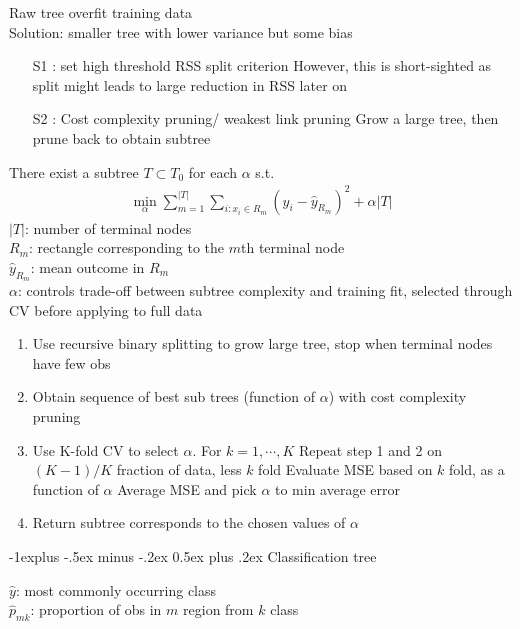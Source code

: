 \documentclass[a4paper,12pt,landscape]{article}
\makeatletter
\renewcommand{\subsection}{\@startsection{subsection}{2}{0mm}%
                                {-1explus -.5ex minus -.2ex}%
                                {0.5ex plus .2ex}%
                                {\normalfont\normalsize\bfseries\color{blue}}}
\makeatother
\begin{document}
\begin{multicols}{3}
Raw tree overfit training data\\
Solution: smaller tree with lower variance but some bias

\begin{enumerate}
    \item[S1]: set high threshold RSS split criterion
        \subitem However, this is short-sighted as split might leads to large reduction in RSS later on
    \item[S2]: Cost complexity pruning/ weakest link pruning
        \subitem Grow a large tree, then prune back to obtain subtree
\end{enumerate}

There exist a subtree $T \subset T_0$ for each $\alpha$ s.t.
\begin{align*}
    \min_{\alpha} \sum_{m=1}^{|T|}\sum_{i:x_i\in R_m} (y_i - \hat y_{R_m})^2 + \alpha |T|
\end{align*}
$|T|$: number of terminal nodes\\
$R_m$: rectangle corresponding to the $m$th terminal node\\
$\hat{y}_{R_m}$: mean outcome in $R_m$\\
$\alpha$: controls trade-off between subtree complexity and training fit, selected through CV before applying to
full data

\begin{enumerate}
    \item Use recursive binary splitting to grow large tree, stop when terminal nodes have few obs
    \item Obtain sequence of best sub trees (function of $\alpha$) with cost complexity pruning
    \item Use K-fold CV to select $\alpha$. For $k = 1, \cdots, K$
        \subitem Repeat step 1 and 2 on $(K-1)/K$ fraction of data, less $k$ fold
        \subitem Evaluate MSE based on $k$ fold, as a function of $\alpha$
        \subitem Average MSE and pick $\alpha$ to min average error
    \item Return subtree corresponds to the chosen values of $\alpha$
\end{enumerate}

\subsection{Classification tree}

$\hat{y}$: most commonly occurring class\\
$\hat{p}_{mk}$: proportion of obs in $m$ region from $k$ class


\end{multicols}
\end{document}
